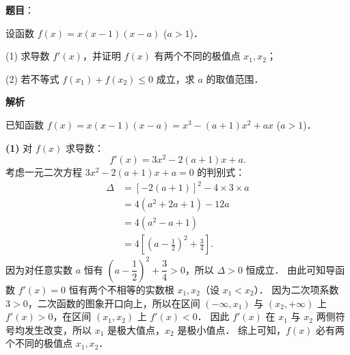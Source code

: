 \begin{answer}

\textbf{题目}：

设函数 $f(x) = x(x - 1)(x - a)$ ($a > 1$)．

(1) 求导数 $f'(x)$，并证明 $f(x)$ 有两个不同的极值点 $x_1, x_2$；

(2) 若不等式 $f(x_1) + f(x_2) \leqslant 0$ 成立，求 $a$ 的取值范围．

\textbf{解析}

已知函数 $f(x) = x(x - 1)(x - a) = x^3 - (a + 1)x^2 + ax$ ($a > 1$)．

\textbf{(1)}
对 $f(x)$ 求导数：
\nopagebreak[4]
\[
f'(x) = 3x^2 - 2(a + 1)x + a.
\]
考虑一元二次方程 $3x^2 - 2(a + 1)x + a = 0$ 的判别式：
\nopagebreak[4]
\[
\begin{aligned}
\Delta &= [-2(a + 1)]^2 - 4 \times 3 \times a \\
&= 4(a^2 + 2a + 1) - 12a \\
&= 4(a^2 - a + 1) \\
&= 4\left[\left(a - \frac{1}{2}\right)^2 + \frac{3}{4}\right].
\end{aligned}
\]
因为对任意实数 $a$ 恒有 $\left(a - \dfrac{1}{2}\right)^2 + \dfrac{3}{4} > 0$，所以 $\Delta > 0$ 恒成立．
由此可知导函数 $f'(x) = 0$ 恒有两个不相等的实数根 $x_1, x_2$（设 $x_1 < x_2$）．
因为二次项系数 $3 > 0$，二次函数的图象开口向上，所以在区间 $(-\infty, x_1)$ 与 $(x_2, +\infty)$ 上 $f'(x) > 0$，在区间 $(x_1, x_2)$ 上 $f'(x) < 0$．
因此 $f'(x)$ 在 $x_1$ 与 $x_2$ 两侧符号均发生改变，所以 $x_1$ 是极大值点，$x_2$ 是极小值点．
综上可知，$f(x)$ 必有两个不同的极值点 $x_1, x_2$．


\end{answer}
